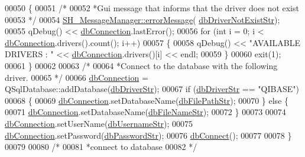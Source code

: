 \begin{DoxyCode}
00050     \{
00051         \textcolor{comment}{/*}
00052 \textcolor{comment}{        *Gui message that informs that the driver does not exist}
00053 \textcolor{comment}{        */}
00054         \hyperlink{classSH__MessageManager_acb5615cc90f198f4768da800a5d32362}{SH\_MessageManager::errorMessage}(
      \hyperlink{SH__DatabaseManager_8h_adeeb3449586b533bdd3cd5938d501807}{dbDriverNotExistStr});
00055         qDebug() << \hyperlink{classSH__DatabaseManager_a9291f61c3abbba2c4f1567b1d8325f0e}{dbConnection}.lastError();
00056         \textcolor{keywordflow}{for} (\textcolor{keywordtype}{int} i = 0; i < \hyperlink{classSH__DatabaseManager_a9291f61c3abbba2c4f1567b1d8325f0e}{dbConnection}.drivers().count(); i++)
00057         \{
00058             qDebug() << \textcolor{stringliteral}{"AVAILABLE DRIVERS : "} << \hyperlink{classSH__DatabaseManager_a9291f61c3abbba2c4f1567b1d8325f0e}{dbConnection}.drivers()[i] << endl;
00059         \}
00060         exit(1);
00061     \}
00062 
00063     \textcolor{comment}{/*}
00064 \textcolor{comment}{    *Connect to the database with the following driver.}
00065 \textcolor{comment}{    */}
00066     \hyperlink{classSH__DatabaseManager_a9291f61c3abbba2c4f1567b1d8325f0e}{dbConnection} = QSqlDatabase::addDatabase(\hyperlink{SH__DatabaseManager_8h_a867ada6d1926e2ded0e68678e02a19c7}{dbDriverStr});
00067     \textcolor{keywordflow}{if} (\hyperlink{SH__DatabaseManager_8h_a867ada6d1926e2ded0e68678e02a19c7}{dbDriverStr} == \textcolor{stringliteral}{"QIBASE"})
00068     \{
00069         \hyperlink{classSH__DatabaseManager_a9291f61c3abbba2c4f1567b1d8325f0e}{dbConnection}.setDatabaseName(\hyperlink{SH__DatabaseManager_8h_acee79beb6e5aec996fd46b84264d072a}{dbFilePathStr});
00070     \} \textcolor{keywordflow}{else} \{
00071         \hyperlink{classSH__DatabaseManager_a9291f61c3abbba2c4f1567b1d8325f0e}{dbConnection}.setDatabaseName(\hyperlink{SH__DatabaseManager_8h_a6c6a636455d1d86d7215a52de4bc6828}{dbFileNameStr});
00072     \}
00073 
00074     \hyperlink{classSH__DatabaseManager_a9291f61c3abbba2c4f1567b1d8325f0e}{dbConnection}.setUserName(\hyperlink{SH__DatabaseManager_8h_a15964752bd7d7c2075f3bafca2218411}{dbUsernameStr});
00075     \hyperlink{classSH__DatabaseManager_a9291f61c3abbba2c4f1567b1d8325f0e}{dbConnection}.setPassword(\hyperlink{SH__DatabaseManager_8h_a5dbd4602b69f5a87243d49f9c873ac64}{dbPasswordStr});
00076     \hyperlink{classSH__DatabaseManager_aeb077fe5437f435c0cbe8d77d96dd846}{dbConnect}();
00077 
00078 \}
00079 
00080 \textcolor{comment}{/*}
00081 \textcolor{comment}{         *connect to database}
00082 \textcolor{comment}{         */}

\end{DoxyCode}
